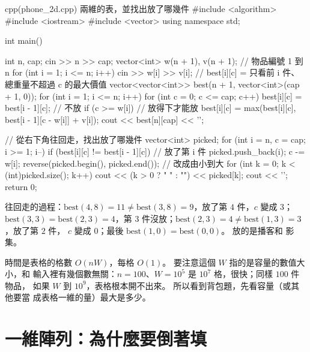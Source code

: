 \begin{example}[label=ex:knap-2d]{cpp}{(phone\_2d.cpp) 兩維的表，並找出放了哪幾件}
#include <algorithm>
#include <iostream>
#include <vector>
using namespace std;

int main() {
    int n, cap;
    cin >> n >> cap;
    vector<int> w(n + 1), v(n + 1);         // 物品編號 1 到 n
    for (int i = 1; i <= n; i++) {
        cin >> w[i] >> v[i];
    }
    // best[i][c] = 只看前 i 件、總重量不超過 c 的最大價值
    vector<vector<int>> best(n + 1, vector<int>(cap + 1, 0));
    for (int i = 1; i <= n; i++) {
        for (int c = 0; c <= cap; c++) {
            best[i][c] = best[i - 1][c];             // 不放
            if (c >= w[i]) {                         // 放得下才能放
                best[i][c] = max(best[i][c], best[i - 1][c - w[i]] + v[i]);
            }
        }
    }
    cout << best[n][cap] << '\n';

    // 從右下角往回走，找出放了哪幾件
    vector<int> picked;
    for (int i = n, c = cap; i >= 1; i--) {
        if (best[i][c] != best[i - 1][c]) {          // 放了第 i 件
            picked.push_back(i);
            c -= w[i];
        }
    }
    reverse(picked.begin(), picked.end());       // 改成由小到大
    for (int k = 0; k < (int)picked.size(); k++) {
        cout << (k > 0 ? " " : "") << picked[k];
    }
    cout << '\n';
    return 0;
}
\end{example}


往回走的過程：$\mathrm{best}(4, 8) = 11 \ne \mathrm{best}(3, 8) = 9$，放了第
$4$ 件，$c$ 變成 $3$；$\mathrm{best}(3, 3) = \mathrm{best}(2, 3) = 4$，第 $3$
件沒放；$\mathrm{best}(2, 3) = 4 \ne \mathrm{best}(1, 3) = 3$，放了第 $2$ 件，
$c$ 變成 $0$；最後 $\mathrm{best}(1, 0) = \mathrm{best}(0, 0)$。 放的是播客和
影集。

時間是表格的格數 $O(nW)$，每格 $O(1)$。 要注意這個 $W$ 指的是容量的數值大小，和
輸入裡有幾個數無關：$n = 100$、$W = 10^5$ 是 $10^7$ 格，很快；同樣 $100$ 件物品，
如果 $W$ 到 $10^9$，表格根本開不出來。 所以看到背包題，先看容量（或其他要當
成表格一維的量）最大是多少。

\section{一維陣列：為什麼要倒著填}
\label{sec:knap-1d}

